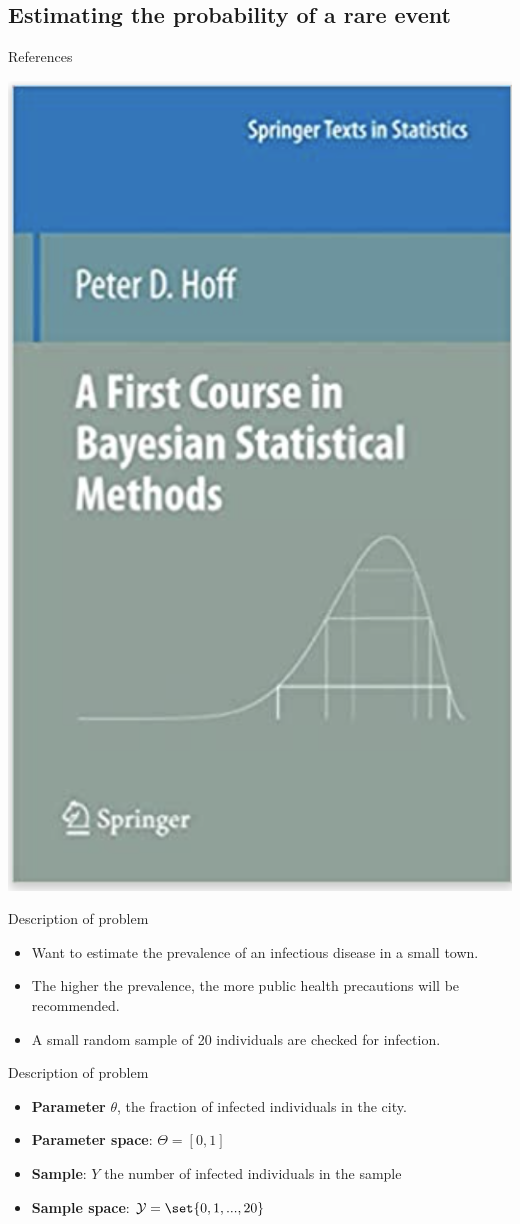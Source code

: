 \documentclass[10pt]{beamer}
\begin{document}
\subsection{Estimating the probability of a rare event}

\begin{frame}{References}

\begin{center}
\includegraphics[width=.5\textwidth]{images/hoff_book}
\end{center}

\end{frame}

\begin{frame}{Description of problem}

\begin{itemize}
\item Want to estimate the prevalence of an infectious disease in a small town.
\item The higher the prevalence,  the more public health precautions will be recommended.
\item A small random sample of 20 individuals are checked for infection.
\end{itemize}
\end{frame}

\begin{frame}{Description of problem}

\begin{itemize}
\item \textbf{Parameter} $\theta$,  the fraction of infected individuals in the city.
\item \textbf{Parameter space}:  $\Theta = [0,1]$
\item \textbf{Sample}: $Y$ the number of infected individuals in the sample
\item \textbf{Sample space}: $\mathcal{Y} = \set{0,1,...,20}$
\end{itemize}

\end{frame}
\end{document}
